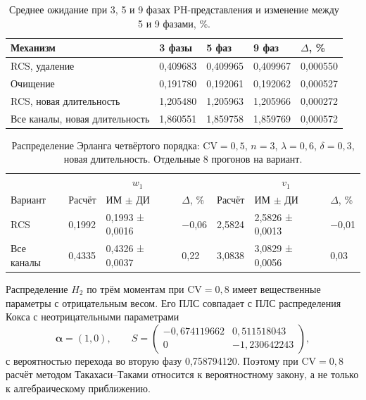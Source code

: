 \documentclass[a4paper,12pt]{article}
\begin{document}
\begin{table}[!htbp]
\centering\small\setlength{\tabcolsep}{2pt}
\begin{tabular}{@{}p{5.76cm}p{2.55cm}p{2.55cm}p{2.55cm}p{2.17cm}@{}}
\toprule
Механизм & 3 фазы & 5 фаз & 9 фаз & $\Delta$, \% \\
\midrule
RCS, удаление & 0,409683 & 0,409965 & 0,409967 & 0,000550 \\
Очищение & 0,191780 & 0,192061 & 0,192062 & 0,000527 \\
RCS, новая длительность & 1,205480 & 1,205963 & 1,205966 & 0,000272 \\
Все каналы, новая длительность & 1,860551 & 1,859758 & 1,859769 & 0,000572 \\
\bottomrule
\end{tabular}
\caption{Среднее ожидание при 3, 5 и 9 фазах PH-представления и изменение между 5 и 9 фазами, \%.}
\label{tab:ph}
\end{table}

\begin{table}[!htbp]
\centering\small\setlength{\tabcolsep}{2pt}
\begin{tabular}{@{}p{4.16cm}p{1.61cm}p{2.83cm}p{1.28cm}p{1.61cm}p{2.83cm}p{1.28cm}@{}}
\toprule
 & \multicolumn{3}{c}{$w_1$} & \multicolumn{3}{c}{$v_1$} \\
Вариант & Расчёт & ИМ $\pm$ ДИ & $\Delta$, \% & Расчёт & ИМ $\pm$ ДИ & $\Delta$, \% \\
\midrule
RCS & 0,1992 & 0,1993 ± 0,0016 & −0,06 & 2,5824 & 2,5826 ± 0,0013 & −0,01 \\
Все каналы & 0,4335 & 0,4326 ± 0,0037 & 0,22 & 3,0838 & 3,0829 ± 0,0056 & 0,03 \\
\bottomrule
\end{tabular}
\caption{Распределение Эрланга четвёртого порядка: \(\mathrm{CV}=0{,}5\), \(n=3\), \(\lambda=0{,}6\), \(\delta=0{,}3\), новая длительность. Отдельные 8 прогонов на вариант.}
\label{tab:erlang}
\end{table}

Распределение \(H_2\) по трём моментам при \(\mathrm{CV}=0{,}8\) имеет вещественные параметры с отрицательным весом. Его ПЛС совпадает с ПЛС распределения Кокса с неотрицательными параметрами
\[
\boldsymbol\alpha=(1,0),\qquad
S=\begin{pmatrix}-0{,}674119662&0{,}511518043\\0&-1{,}230642243\end{pmatrix},
\]
с вероятностью перехода во вторую фазу 0{,}758794120. Поэтому при \(\mathrm{CV}=0{,}8\) расчёт методом Такахаси--Таками относится к вероятностному закону, а не только к алгебраическому приближению.
\end{document}
